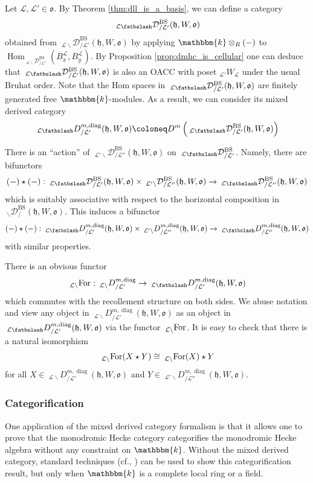 \documentclass{amsart}
\renewcommand{\k}{\mathbbm{k}}
\newcommand{\scrL}{\mathcal{L}}
\DeclareMathOperator{\Hom}{Hom}
\newcommand{\fr}[1]{\mathfrak{#1}}
\DeclareMathOperator{\diag}{diag}
\DeclareMathOperator{\BS}{BS}
\newcommand{\ForME}[1]{\:_{#1 \backslash} \textnormal{For}}
\newcommand{\EWmon}[2]{\:_{#1 \backslash} \mathcal{D}_{/ #2} }
\newcommand{\EWmonME}[2]{\:_{#1 \smallleftdash} \mathcal{D}_{/ #2} }
\newcommand{\DDBE}[2]{\:_{#1 \backslash} D_{/ #2}^{m, \diag}}
\newcommand{\DDME}[2]{\:_{#1 \smallleftdash} D_{/ #2}^{m, \diag}}
\newcommand{\W}[2]{{}_{#1}W_{#2}}
\newcommand{\ux}{\underline{x}}
\newcommand{\uy}{\underline{y}}
\newcommand{\bfslash}{\mathbin{\fatbslash}}
\newcommand*\smallleftdash{\bfslash}
\theoremstyle{definition}
\numberwithin{equation}{subsection}
\begin{document}
Let $\scrL, \scrL' \in \fr{o}$. By Theorem \ref{thm:dll_is_a_basis}, we can define a category
\[\EWmonME{\scrL}{\scrL'}^{\BS} (\fr{h}, W, \fr{o})\]
obtained from $\EWmon{\scrL}{\scrL'}^{\BS} (\fr{h}, W, \fr{o})$ by applying $\k \otimes_{R} (-)$ to $\Hom_{\EWmon{\scrL}{\scrL'}^{\BS}} (B_{\ux}^{\scrL}, B_{\uy}^{\scrL})$.
By Proposition \ref{prop:dmhc_is_cellular} one can deduce that $\EWmonME{\scrL}{\scrL'}^{\BS} (\fr{h}, W, \fr{o})$ is also an OACC with poset $\W{\scrL'}{\scrL}$ under the usual Bruhat order.
Note that the Hom spaces in $\EWmonME{\scrL}{\scrL'}^{\BS} (\fr{h}, W, \fr{o})$ are finitely generated free $\k$-modules.
As a result, we can consider its mixed derived category
\[\DDME{\scrL}{\scrL'} (\fr{h}, W, \fr{o}) \coloneq D^m \left( \EWmonME{\scrL}{\scrL'}^{\BS} (\fr{h}, W, \fr{o}) \right)\]

There is an ``action'' of $\EWmon{\scrL'}{\scrL''}^{\BS} (\fr{h}, W, \fr{o})$ on $\EWmonME{\scrL}{\scrL'}^{\BS}$. Namely, there are bifunctors
\[(-) \star (-) : \EWmonME{\scrL}{\scrL'}^{\BS} (\fr{h}, W, \fr{o}) \times \EWmon{\scrL'}{\scrL''}^{\BS} (\fr{h}, W, \fr{o}) \to \EWmonME{\scrL}{\scrL''}^{\BS}  (\fr{h}, W, \fr{o})\]
which is suitably associative with respect to the horizontal composition in $\EWmon{}{}^{\BS} (\fr{h}, W, \fr{o})$.
This induces a bifunctor
\[(-) \star (-) : \DDME{\scrL}{\scrL'} (\fr{h}, W, \fr{o}) \times \DDBE{\scrL'}{\scrL''} (\fr{h}, W, \fr{o}) \to \DDME{\scrL}{\scrL''} (\fr{h}, W, \fr{o})\]
with similar properties.

There is an obvious functor
\[\ForME{\scrL} : \DDBE{\scrL}{\scrL'} \to \DDME{\scrL}{\scrL'} (\fr{h}, W, \fr{o})\]
which commutes with the recollement structure on both sides.
We abuse notation and view any object in $\DDBE{\scrL}{\scrL'} (\fr{h}, W, \fr{o})$ as an object in $\DDME{\scrL}{\scrL'} (\fr{h}, W, \fr{o})$ via the functor $\ForME{\scrL}$.
It is easy to check that there is a natural isomorphism 
\[\ForME{\scrL} (X \star Y) \cong \ForME{\scrL} (X) \star Y\]
for all $X \in \DDBE{\scrL}{\scrL'} (\fr{h}, W, \fr{o})$ and $Y \in \DDBE{\scrL'}{\scrL''} (\fr{h}, W, \fr{o})$.

\subsubsection{Categorification}\label{subsubsec:cat_of_diag_hecke}

One application of the mixed derived category formalism is that it allows one to prove that the monodromic Hecke category categorifies the monodromic Hecke algebra without any constraint on $\k$.
Without the mixed derived category, standard techniques (cf., \cite{EL, EW}) can be used to show this categorification result, but only when $\k$ is a complete local ring or a field.
\end{document}
